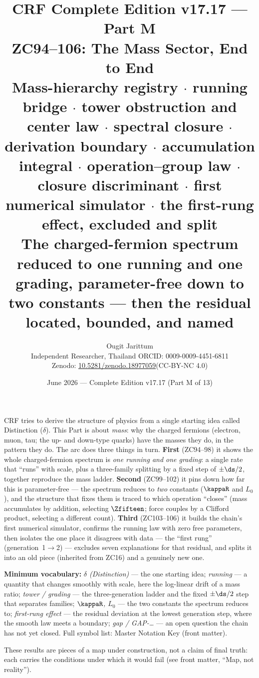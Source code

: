 \documentclass[12pt, a4paper]{article}
\title{%
  \textbf{\color{deepblue}CRF Complete Edition v17.17 --- Part M}\\[0.4em]
  \large ZC94--106: The Mass Sector, End to End\\[0.2em]
  \normalsize\color{mutedgray}
  Mass-hierarchy registry $\cdot$ running bridge $\cdot$ tower obstruction
  and center law $\cdot$ spectral closure $\cdot$ derivation boundary $\cdot$
  accumulation integral $\cdot$ operation--group law $\cdot$ closure
  discriminant $\cdot$ first numerical simulator $\cdot$ the first-rung
  effect, excluded and split\\[0.2em]
  \textbf{\color{crfgreen}The charged-fermion spectrum reduced to one running
  and one grading, parameter-free down to two constants --- then the residual
  located, bounded, and named}
}
\author{Ougit Jarittum\\
\small Independent Researcher, Thailand\quad
ORCID: 0009-0009-4451-6811\\
\small Zenodo: \href{https://doi.org/10.5281/zenodo.18977059}%
{10.5281/zenodo.18977059}\quad (CC-BY-NC 4.0)
}
\date{June 2026 --- Complete Edition v17.17 (Part M of 13)}
\begin{document}
\sloppy


\maketitle
\tableofcontents
\newpage

\begin{keybox}[title={If you are just arriving --- Part M in plain language}]
\sloppy
CRF tries to derive the structure of physics from a single starting idea
called Distinction ($\delta$). This Part is about \emph{mass}: why the
charged fermions (electron, muon, tau; the up- and down-type quarks) have
the masses they do, in the pattern they do. The arc does three things in
turn. \textbf{First} (ZC94--98) it shows the whole charged-fermion spectrum
is \emph{one running and one grading}: a single rate that ``runs'' with
scale, plus a three-family splitting by a fixed step of $\pm\ds/2$, together
reproduce the mass ladder. \textbf{Second} (ZC99--102) it pins down how far
this is parameter-free --- the spectrum reduces to \emph{two} constants
($\kappaR$ and $L_0$), and the structure that fixes them is traced to which
operation ``closes'' (mass accumulates by addition, selecting $\Zfifteen$;
force couples by a Clifford product, selecting a different count). \textbf{Third}
(ZC103--106) it builds the chain's first numerical simulator, confirms the
running law with zero free parameters, then isolates the one place it
disagrees with data --- the ``first rung'' (generation~1$\to$2) --- excludes
seven explanations for that residual, and splits it into an old piece
(inherited from ZC16) and a genuinely new one.

\textbf{Minimum vocabulary:}
\textit{$\delta$ (Distinction)} --- the one starting idea;\;
\textit{running} --- a quantity that changes smoothly with scale, here the
log-linear drift of a mass ratio;\;
\textit{tower / grading} --- the three-generation ladder and the fixed
$\pm\ds/2$ step that separates families;\;
\textit{$\kappaR$, $L_0$} --- the two constants the spectrum reduces to;\;
\textit{first-rung effect} --- the residual deviation at the lowest
generation step, where the smooth law meets a boundary;\;
\textit{gap / GAP-\dots} --- an open question the chain has not yet closed.
Full symbol list: Master Notation Key (front matter).

These results are pieces of a map under construction, not a claim of final
truth: each carries the conditions under which it would fail (see front
matter, ``Map, not reality'').
\end{keybox}
\end{document}
